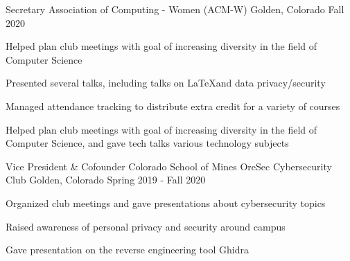 \vspace{-2.0mm}

\begin{cventries}


\cventry
  {Secretary}
  {Association of Computing - Women (ACM-W)}
  {Golden, Colorado}
  {Fall 2020}
  {
    \begin{cvitems}
      \ifcv
      \item {Helped plan club meetings with goal of increasing diversity in the field of Computer Science}
      \item {Presented several talks, including talks on \LaTeX and data privacy/security} %
      \item {Managed attendance tracking to distribute extra credit for a variety of courses}
      \else
      \item {Helped plan club meetings with goal of increasing diversity in the field of Computer Science, and gave tech talks various technology subjects} %
      \fi
    \end{cvitems}
  }
  {}

  \cventry
    {Vice President \& Cofounder} %
    {Colorado School of Mines OreSec Cybersecurity Club} %
    {Golden, Colorado} %
    {Spring 2019 - Fall 2020} %
    {
      \begin{cvitems} %
        \item {Organized club meetings and gave presentations about
            cybersecurity topics}
          \ifcv
        \item {Raised awareness of personal privacy and security around campus}
        \item {Gave presentation on the reverse engineering tool Ghidra}
        \fi
      \end{cvitems}
    }
    {}



\end{cventries}
